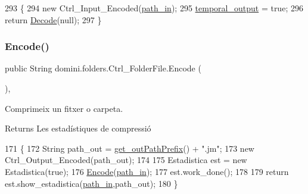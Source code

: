\begin{DoxyCode}
293                                \{
294         \textcolor{keyword}{new} Ctrl\_Input\_Encoded(\hyperlink{classdomini_1_1folders_1_1Ctrl__FolderFile_a0d3946bb2832a1f34d0c2227df5c71c4}{path\_in});
295         \hyperlink{classdomini_1_1folders_1_1Ctrl__FolderFile_a0db81590abe27b21a9b8c37633c86fa6}{temporal\_output} = \textcolor{keyword}{true};
296         \textcolor{keywordflow}{return} \hyperlink{classdomini_1_1folders_1_1Ctrl__FolderFile_a5d28ac7f5223ecd40a242148e86447c1}{Decode}(null);
297     \}
\end{DoxyCode}
\mbox{\label{classdomini_1_1folders_1_1Ctrl__FolderFile_a7c47fd5127ae6f713a4fa7f75002a6f6}} 
\subsubsection{\texorpdfstring{Encode()}{Encode()}\hspace{0.1cm}{\footnotesize\ttfamily [1/2]}}
{\footnotesize\ttfamily public String domini.\+folders.\+Ctrl\+\_\+\+Folder\+File.\+Encode (\begin{DoxyParamCaption}{ }\end{DoxyParamCaption})\hspace{0.3cm}{\ttfamily [inline]}, {\ttfamily [private]}}



Comprimeix un fitxer o carpeta. 

\begin{DoxyReturn}{Returns}
Les estadístiques de compressió 
\end{DoxyReturn}

\begin{DoxyCode}
171                             \{
172         String path\_out = \hyperlink{classdomini_1_1folders_1_1Ctrl__FolderFile_a11c6b1b4a25d12b8091c7c96b3da1ea7}{get\_outPathPrefix}() + \textcolor{stringliteral}{".jm"};
173         \textcolor{keyword}{new} Ctrl\_Output\_Encoded(path\_out);
174 
175         Estadistica est = \textcolor{keyword}{new} Estadistica(\textcolor{keyword}{true});
176         \hyperlink{classdomini_1_1folders_1_1Ctrl__FolderFile_a7c47fd5127ae6f713a4fa7f75002a6f6}{Encode}(\hyperlink{classdomini_1_1folders_1_1Ctrl__FolderFile_a0d3946bb2832a1f34d0c2227df5c71c4}{path\_in});
177         est.work\_done();
178 
179         \textcolor{keywordflow}{return} est.show\_estadistica(\hyperlink{classdomini_1_1folders_1_1Ctrl__FolderFile_a0d3946bb2832a1f34d0c2227df5c71c4}{path\_in},path\_out);
180     \}
\end{DoxyCode}
\mbox{\label{classdomini_1_1folders_1_1Ctrl__FolderFile_ac2cb74a86677ce947b403cc63b91e874}} 
